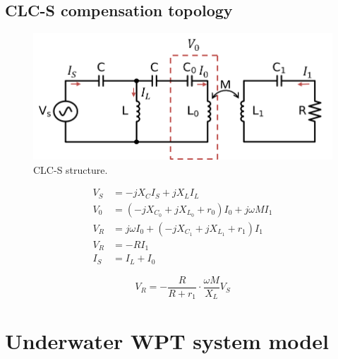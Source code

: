 \subsection{CLC-S compensation topology}
\begin{figure}[htbp]
    \centering
    \includegraphics[width=0.93\linewidth]{images/2_clc_s_scheme.png}
    \caption{CLC-S structure.}
    \label{fig:clcs topology}
\end{figure}


\begin{equation}
\begin{align}
    V_S &= -jX_CI_S + j X_{L}I_L \\
    V_0 &= (-jX_{C_0}+jX_{L_0}+r_0)I_0 + j\omega MI_1 \\
    V_R &= j\omega I_0 +(-jX_{C_1}+jX_{L_1}+r_1)I_1 \\
    V_R &= -RI_1 \\
    I_S &= I_L+I_0
\end{align}
\end{equation}

\begin{equation}
    V_R = - \frac{R}{R+r_1}\cdot \frac{\omega M}{X_L}V_S
\end{equation}

\section{Underwater WPT system model}


